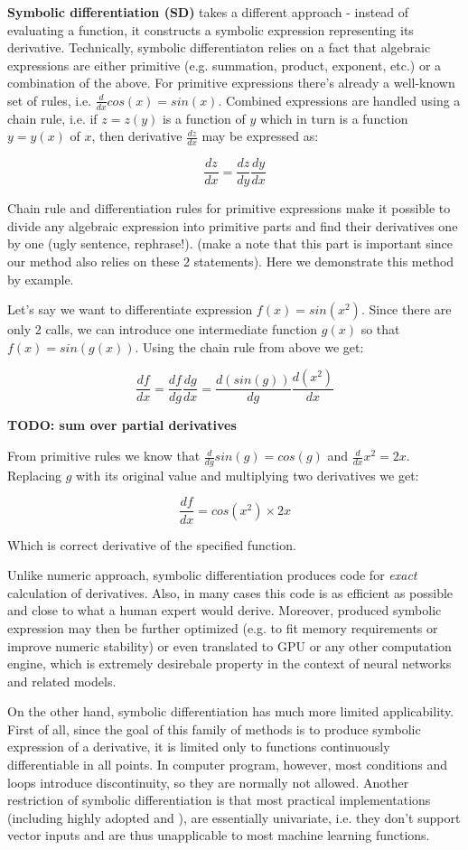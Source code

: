 \documentclass[conference]{IEEEtran}
\begin{document}
\textbf{Symbolic differentiation (SD)} takes a different approach -
instead of evaluating a function, it constructs a symbolic expression
representing its derivative. Technically, symbolic differentiaton
relies on a fact that algebraic expressions are either primitive
(e.g. summation, product, exponent, etc.) or a combination of the
above. For primitive expressions there's already a well-known set of
rules, i.e. $\frac{d}{dx}cos(x) = sin(x)$. Combined expressions are
handled using a chain rule, i.e. if $z = z(y)$ is a function of $y$
which in turn is a function $y = y(x)$ of $x$, then derivative
$\frac{dz}{dx}$ may be expressed as:

$$\frac{dz}{dx} = \frac{dz}{dy}\frac{dy}{dx}$$

Chain rule and differentiation rules for primitive expressions make it
possible to divide any algebraic expression into primitive parts and
find their derivatives one by one (ugly sentence, rephrase!). (make a
note that this part is important since our method also relies on these
2 statements). Here we demonstrate this method by example.

Let's say we want to differentiate expression $f(x) = sin(x^2)$. Since
there are only 2 calls, we can introduce one intermediate function
$g(x)$ so that $f(x) = sin(g(x))$. Using the chain rule from above we get:

$$\frac{df}{dx} = \frac{df}{dg}\frac{dg}{dx} = \frac{d(sin(g))}{dg}\frac{d(x^2)}{dx}$$

\textbf{TODO: sum over partial derivatives}

From primitive rules we know that $\frac{d}{dg}sin(g) = cos(g)$ and
$\frac{d}{dx}x^2 = 2x$. Replacing $g$ with its original value and
multiplying two derivatives we get:

$$\frac{df}{dx} = cos(x^2) \times 2x$$

Which is correct derivative of the specified function.

Unlike numeric approach, symbolic differentiation produces code for
\textit{exact} calculation of derivatives. Also, in many cases this
code is as efficient as possible and close to what a human expert
would derive. Moreover, produced symbolic expression may then be
further optimized (e.g. to fit memory requirements or improve numeric
stability) or even translated to GPU or any other computation engine,
which is extremely desirebale property in the context of neural
networks and related models.

On the other hand, symbolic differentiation has much more limited
applicability. First of all, since the goal of this family of methods
is to produce symbolic expression of a derivative, it is limited only
to functions continuously differentiable in all points. In computer
program, however, most conditions and loops introduce discontinuity,
so they are normally not allowed. Another restriction of symbolic
differentiation is that most practical implementations (including
highly adopted \cite{SymPy} and \cite{Mathematica}), are essentially
univariate, i.e. they don't support vector inputs and are thus
unapplicable to most machine learning functions.
\end{document}
